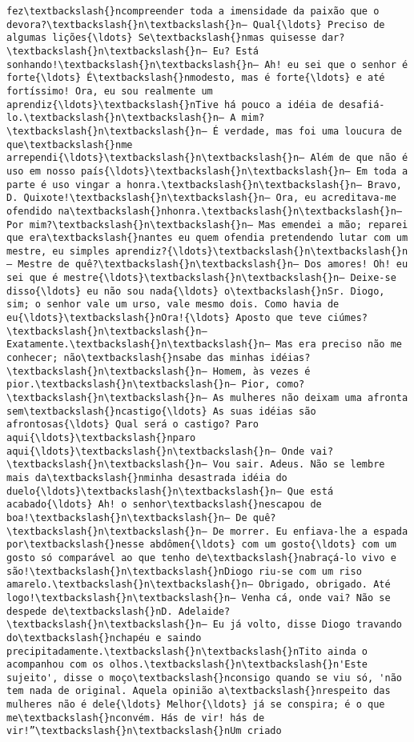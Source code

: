 \begin{Verbatim}[commandchars=\\\{\}]
fez\textbackslash{}ncompreender toda a imensidade da paixão que o devora?\textbackslash{}n\textbackslash{}n— Qual{\ldots} Preciso de algumas lições{\ldots} Se\textbackslash{}nmas quisesse dar?\textbackslash{}n\textbackslash{}n— Eu? Está sonhando!\textbackslash{}n\textbackslash{}n— Ah! eu sei que o senhor é forte{\ldots} É\textbackslash{}nmodesto, mas é forte{\ldots} e até fortíssimo! Ora, eu sou realmente um aprendiz{\ldots}\textbackslash{}nTive há pouco a idéia de desafiá-lo.\textbackslash{}n\textbackslash{}n— A mim?\textbackslash{}n\textbackslash{}n— É verdade, mas foi uma loucura de que\textbackslash{}nme arrependi{\ldots}\textbackslash{}n\textbackslash{}n— Além de que não é uso em nosso país{\ldots}\textbackslash{}n\textbackslash{}n— Em toda a parte é uso vingar a honra.\textbackslash{}n\textbackslash{}n— Bravo, D. Quixote!\textbackslash{}n\textbackslash{}n— Ora, eu acreditava-me ofendido na\textbackslash{}nhonra.\textbackslash{}n\textbackslash{}n— Por mim?\textbackslash{}n\textbackslash{}n— Mas emendei a mão; reparei que era\textbackslash{}nantes eu quem ofendia pretendendo lutar com um mestre, eu simples aprendiz?{\ldots}\textbackslash{}n\textbackslash{}n— Mestre de quê?\textbackslash{}n\textbackslash{}n— Dos amores! Oh! eu sei que é mestre{\ldots}\textbackslash{}n\textbackslash{}n— Deixe-se disso{\ldots} eu não sou nada{\ldots} o\textbackslash{}nSr. Diogo, sim; o senhor vale um urso, vale mesmo dois. Como havia de eu{\ldots}\textbackslash{}nOra!{\ldots} Aposto que teve ciúmes?\textbackslash{}n\textbackslash{}n— Exatamente.\textbackslash{}n\textbackslash{}n— Mas era preciso não me conhecer; não\textbackslash{}nsabe das minhas idéias?\textbackslash{}n\textbackslash{}n— Homem, às vezes é pior.\textbackslash{}n\textbackslash{}n— Pior, como?\textbackslash{}n\textbackslash{}n— As mulheres não deixam uma afronta sem\textbackslash{}ncastigo{\ldots} As suas idéias são afrontosas{\ldots} Qual será o castigo? Paro aqui{\ldots}\textbackslash{}nparo aqui{\ldots}\textbackslash{}n\textbackslash{}n— Onde vai?\textbackslash{}n\textbackslash{}n— Vou sair. Adeus. Não se lembre mais da\textbackslash{}nminha desastrada idéia do duelo{\ldots}\textbackslash{}n\textbackslash{}n— Que está acabado{\ldots} Ah! o senhor\textbackslash{}nescapou de boa!\textbackslash{}n\textbackslash{}n— De quê?\textbackslash{}n\textbackslash{}n— De morrer. Eu enfiava-lhe a espada por\textbackslash{}nesse abdômen{\ldots} com um gosto{\ldots} com um gosto só comparável ao que tenho de\textbackslash{}nabraçá-lo vivo e são!\textbackslash{}n\textbackslash{}nDiogo riu-se com um riso amarelo.\textbackslash{}n\textbackslash{}n— Obrigado, obrigado. Até logo!\textbackslash{}n\textbackslash{}n— Venha cá, onde vai? Não se despede de\textbackslash{}nD. Adelaide?\textbackslash{}n\textbackslash{}n— Eu já volto, disse Diogo travando do\textbackslash{}nchapéu e saindo precipitadamente.\textbackslash{}n\textbackslash{}nTito ainda o acompanhou com os olhos.\textbackslash{}n\textbackslash{}n'Este sujeito', disse o moço\textbackslash{}nconsigo quando se viu só, 'não tem nada de original. Aquela opinião a\textbackslash{}nrespeito das mulheres não é dele{\ldots} Melhor{\ldots} já se conspira; é o que me\textbackslash{}nconvém. Hás de vir! hás de vir!”\textbackslash{}n\textbackslash{}nUm criado 
\end{Verbatim}
